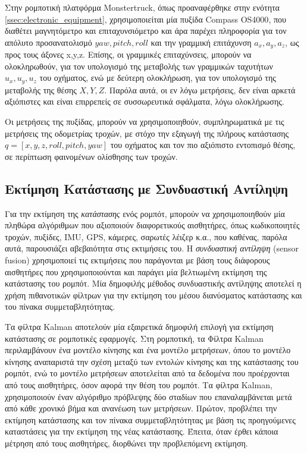 \bigskip
Στην ρομποτική πλατφόρμα {Monstertruck}, όπως προαναφέρθηκε στην ενότητα \ref{ssec:electronic_equipment}, χρησιμοποιείται μία πυξίδα {Compass OS4000}, που διαθέτει μαγνητόμετρο και επιταχυνσιόμετρο και άρα παρέχει πληροφορία για τον απόλυτο προσανατολισμό $yaw, pitch, roll$ και την γραμμική επιτάχυνση $a_x, a_y, a_z$, ως προς τους άξονες x,y,z. Επίσης, οι γραμμικές επιταχύνσεις, μπορούν να ολοκληρωθούν, για τον υπολογισμό της μεταβολής των γραμμικών ταχυτήτων $u_x, u_y, u_z$ του οχήματος, ενώ με δεύτερη ολοκλήρωση, για τον υπολογισμό της μεταβολής της θέσης $X, Y, Z$. Παρόλα αυτά, οι εν λόγω μετρήσεις, δεν είναι αρκετά αξιόπιστες και είναι επιρρεπείς σε συσσωρευτικά σφάλματα, λόγω ολοκλήρωσης.

\bigskip
Οι μετρήσεις της πυξίδας, μπορούν να χρησιμοποιηθούν, συμπληρωματικά με τις μετρήσεις της {οδομετρίας τροχών}, με στόχο την εξαγωγή της πλήρους κατάστασης $q = [x, y, z, roll, pitch, yaw]$  του οχήματος και τον πιο αξιόπιστο εντοπισμό θέσης, σε περίπτωση φαινομένων ολίσθησης των τροχών.

\bigskip
\subsection{Εκτίμηση Κατάστασης με Συνδυαστική Αντίληψη} 
\label{ssec:state_estimation_and_sensor_fusion}
Για την εκτίμηση της \textit{κατάστασης} ενός ρομπότ, μπορούν να χρησιμοποιηθούν μία πληθώρα αλγόριθμων που αξιοποιούν διαφορετικούς αισθητήρες, όπως κωδικοποιητές τροχών, πυξίδες, IMU, GPS, κάμερες, σαρωτές λέιζερ  κ.α., που καθένας, παρόλα αυτά, παρουσιάζει αβεβαιότητα στις εκτιμήσεις του. Η \textit{συνδυαστική αντίληψη} ({sensor fusion}) χρησιμοποιεί τις εκτιμήσεις που παράγονται με βάση τους διάφορους αισθητήρες που χρησιμοποιούνται και παράγει μία βελτιωμένη εκτίμηση της κατάστασης του ρομπότ. Μία δημοφιλής μέθοδος συνδυαστικής αντίληψης αποτελεί η χρήση πιθανοτικών φίλτρων για την εκτίμηση του μέσου διανύσματος κατάστασης και του πίνακα συμμεταβλητότητας.

\bigskip
Τα φίλτρα Kalman αποτελούν μία εξαιρετικά δημοφιλή επιλογή για εκτίμηση κατάστασης σε ρομποτικές εφαρμογές. Στη ρομποτική, τα {Φίλτρα Kalman} περιλαμβάνουν ένα μοντέλο κίνησης και ένα μοντέλο μετρήσεων, όπου το μοντέλο κίνησης αναπαριστά την σχέση μεταξύ των εντολών κίνησης και της κατάστασης του ρομπότ, ενώ το μοντέλο μετρήσεων αποτελείται από τα δεδομένα που προέρχονται από τους αισθητήρες, όσον αφορά την θέση του ρομπότ. Τα φίλτρα Kalman, χρησιμοποιούν έναν αλγόριθμο πρόβλεψης δύο σταδίων που επαναλαμβάνεται μετά από κάθε χρονικό βήμα και ανανέωση των μετρήσεων. Πρώτον, προβλέπει την εκτίμηση κατάστασης και τον πίνακα συμμεταβλητότητας με βάση τις προηγούμενες καταστάσεις για την εκτίμηση της νέας κατάστασης. Έπειτα, όταν έρθει κάποια μέτρηση από τους αισθητήρες, διορθώνει την προβλεπόμενη εκτίμηση.

